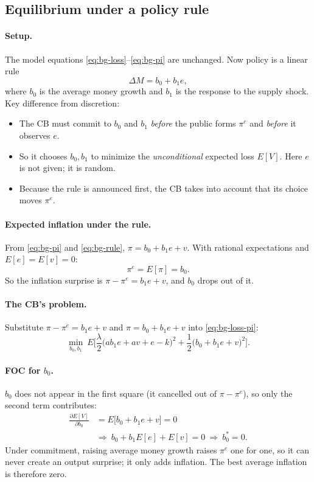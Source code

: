\subsection{Equilibrium under a policy rule }

\paragraph{Setup.} The model equations \eqref{eq:bg-loss}--\eqref{eq:bg-pi} are unchanged. Now policy is a linear rule
\begin{equation}
\Delta M=b_0+b_1e ,\label{eq:bg-rule}
\end{equation}
where $b_0$ is the average money growth and $b_1$ is the response to the supply shock. Key difference from discretion:
\begin{itemize}
  \item The CB must commit to $b_0$ and $b_1$ \emph{before} the public forms $\pi^e$ and \emph{before} it observes $e$.
  \item So it chooses $b_0,b_1$ to minimize the \emph{unconditional} expected loss $E[V]$. Here $e$ is not given; it is random.
  \item Because the rule is announced first, the CB takes into account that its choice moves $\pi^e$.
\end{itemize}

\paragraph{Expected inflation under the rule.} From \eqref{eq:bg-pi} and \eqref{eq:bg-rule}, $\pi=b_0+b_1e+v$. With rational expectations and $E[e]=E[v]=0$:
\[
\pi^e=E[\pi]=b_0 .
\]
So the inflation surprise is $\pi-\pi^e=b_1e+v$, and $b_0$ drops out of it.

\paragraph{The CB's problem.} Substitute $\pi-\pi^e=b_1e+v$ and $\pi=b_0+b_1e+v$ into \eqref{eq:bg-loss-pi}:
\[
\min_{b_0,b_1}\ E\Big[\frac{\lambda}{2}\big(ab_1e+av+e-k\big)^2+\frac12\big(b_0+b_1e+v\big)^2\Big].
\]

\paragraph{FOC for $b_0$.} $b_0$ does not appear in the first square (it cancelled out of $\pi-\pi^e$), so only the second term contributes:
\begin{align*}
\frac{\partial E[V]}{\partial b_0}&=E\big[b_0+b_1e+v\big]=0\\
&\Rightarrow\ b_0+b_1E[e]+E[v]=0\ \Rightarrow\ b_0^*=0 .
\end{align*}
Under commitment, raising average money growth raises $\pi^e$ one for one, so it can never create an output surprise; it only adds inflation. The best average inflation is therefore zero.

